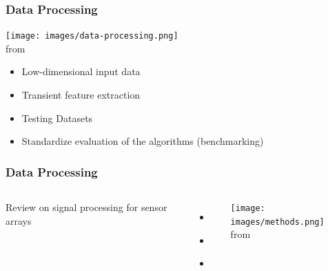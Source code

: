 \documentclass{beamer}
\newcommand{\mancite}[1]{{\scriptsize{\textbf{\color{MainGreen}{[#1] }}}}}
\begin{document}
\begin{frame}
\frametitle{Data Processing}
\begin{center}
\texttt{[image: images/data-processing.png]} \\
{\tiny from \mancite{Gutierrez-Osuna, 2002}}

\begin{itemize}
  \item Low-dimensional input data
  \item Transient feature extraction
  \item Testing Datasets
  \item Standardize evaluation of the algorithms (benchmarking)
\end{itemize}  

\end{center}
\end{frame}

\begin{frame}
\frametitle{Data Processing}
\begin{columns}
Review on signal processing for sensor arrays
\begin{itemize}
  \item \mancite{Gutierrez-Osuna, 2002}
  \item \mancite{Pearce et al., 2003}
  \item \mancite{Martinez et al., 2008}  
\end{itemize}  
\begin{center}
\texttt{[image: images/methods.png]} \\
{\tiny from \mancite{Raman, 2005}}
\end{center}
\end{columns}
\end{frame}
\end{document}
